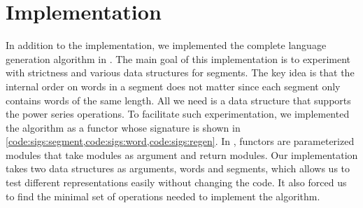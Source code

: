 \section{\ocaml Implementation}
\label{sec:ocaml}

\lstset{language=[Objective]Caml}

In addition to the \haskell implementation, we implemented the complete
language generation algorithm in \ocaml.
The main goal of this implementation is to experiment with strictness
and various data structures for segments. 
The key idea is that the internal order on words in a segment does not matter
since each segment only contains words of the same length.
All we need is a data structure that supports the power series
operations.
%
To facilitate such experimentation, we implemented the
algorithm as a functor whose signature is shown in
\cref{code:sigs:segment,code:sigs:word,code:sigs:regen}.
In \ocaml, functors are parameterized modules that take modules
as argument and return modules. Our implementation
takes two data structures as arguments, words and segments,
which allows us to test different representations easily without changing
the code. It also forced us to find the minimal set of operations
needed to implement the algorithm.

